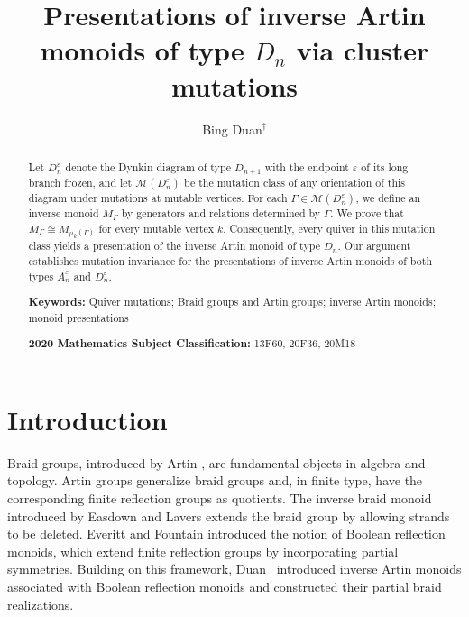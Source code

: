 \documentclass[a4paper, 12pt, reqno]{amsart}
\title{Presentations of inverse Artin monoids of type $D_n$ via cluster mutations}
\author{Bing Duan$^\dag$}
\date{}
\theoremstyle{definition}
\begin{document}
\maketitle

\begin{abstract}
Let $D_n^\varepsilon$ denote the Dynkin diagram of type $D_{n+1}$ with the endpoint $\varepsilon$ of its long branch frozen, and let $\mathcal{M}(D_n^\varepsilon)$ be the mutation class of any orientation of this diagram under mutations at mutable vertices. For each $\Gamma\in\mathcal{M}(D_n^\varepsilon)$, we define an inverse monoid $M_\Gamma$ by generators and relations determined by $\Gamma$. We prove that $M_\Gamma\cong M_{\mu_k(\Gamma)}$ for every mutable vertex $k$. Consequently, every quiver in this mutation class yields a presentation of the inverse Artin monoid of type $D_n$. Our argument establishes mutation invariance for the presentations of inverse Artin monoids of both types $A_n^\varepsilon$ and $D_n^\varepsilon$.

\hspace{0.15cm}

\par\medskip
\noindent\textbf{Keywords:} Quiver mutations; Braid groups and Artin groups; inverse Artin monoids; monoid presentations

\par\medskip
\noindent\textbf{2020 Mathematics Subject Classification:} 13F60, 20F36, 20M18
\end{abstract}

\section{Introduction}\label{sec:introduction}

Braid groups, introduced by Artin \cite{Artin1925,Artin1947}, are fundamental objects in algebra and topology. Artin groups generalize braid groups and, in finite type, have the corresponding finite reflection groups as quotients. The inverse braid monoid introduced by Easdown and Lavers \cite{EL2004} extends the braid group by allowing strands to be deleted. Everitt and Fountain \cite{EF10,EF13} introduced the notion of Boolean reflection monoids, which extend finite reflection groups by incorporating partial symmetries. Building on this framework, Duan~\cite{Duan2025} introduced inverse Artin monoids associated with Boolean reflection monoids and constructed their partial braid realizations.
\end{document}

